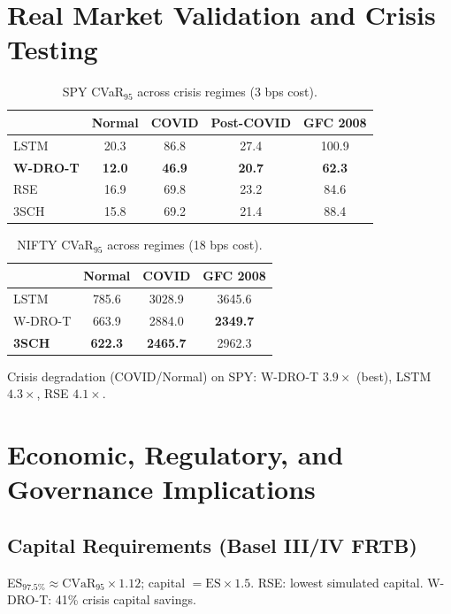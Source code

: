 \documentclass[11pt]{article}
\begin{document}
\section{Real Market Validation and Crisis Testing}

\begin{table}[H]\centering\small
\caption{SPY CVaR$_{95}$ across crisis regimes (3 bps cost).}
\begin{tabular}{@{}lcccc@{}}
\toprule
& \textbf{Normal} & \textbf{COVID} & \textbf{Post-COVID} & \textbf{GFC 2008} \\\midrule
LSTM & 20.3 & 86.8 & 27.4 & 100.9 \\
\textbf{W-DRO-T} & \textbf{12.0} & \textbf{46.9} & \textbf{20.7} & \textbf{62.3} \\
RSE & 16.9 & 69.8 & 23.2 & 84.6 \\
3SCH & 15.8 & 69.2 & 21.4 & 88.4 \\
\bottomrule
\end{tabular}
\end{table}

\begin{table}[H]\centering\small
\caption{NIFTY CVaR$_{95}$ across regimes (18 bps cost).}
\begin{tabular}{@{}lccc@{}}
\toprule
& \textbf{Normal} & \textbf{COVID} & \textbf{GFC 2008} \\\midrule
LSTM & 785.6 & 3028.9 & 3645.6 \\
W-DRO-T & 663.9 & 2884.0 & \textbf{2349.7} \\
\textbf{3SCH} & \textbf{622.3} & \textbf{2465.7} & 2962.3 \\
\bottomrule
\end{tabular}
\end{table}

Crisis degradation (COVID/Normal) on SPY: W-DRO-T $3.9\times$ (best), LSTM $4.3\times$, RSE $4.1\times$.

\section{Economic, Regulatory, and Governance Implications}

\subsection{Capital Requirements (Basel III/IV FRTB)}
ES$_{97.5\%} \approx \mathrm{CVaR}_{95} \times 1.12$; capital $= \mathrm{ES} \times 1.5$. RSE: lowest simulated capital. W-DRO-T: 41\% crisis capital savings.
\end{document}
